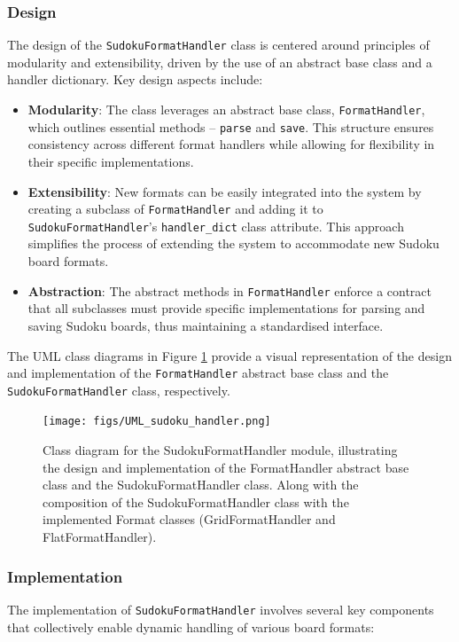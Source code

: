 \documentclass[11pt]{article}
\begin{document}
\subsubsection{Design}
The design of the \texttt{SudokuFormatHandler} class is centered around principles of modularity and extensibility, driven by the use of an abstract base class and a handler dictionary. Key design aspects include:

\begin{itemize}
    \item \textbf{Modularity}: The class leverages an abstract base class, \texttt{FormatHandler}, which outlines essential methods -- \texttt{parse} and \texttt{save}. This structure ensures consistency across different format handlers while allowing for flexibility in their specific implementations.
    \item \textbf{Extensibility}: New formats can be easily integrated into the system by creating a subclass of \texttt{FormatHandler} and adding it to \texttt{SudokuFormatHandler}'s \texttt{handler\_dict} class attribute. This approach simplifies the process of extending the system to accommodate new Sudoku board formats.
    \item \textbf{Abstraction}: The abstract methods in \texttt{FormatHandler} enforce a contract that all subclasses must provide specific implementations for parsing and saving Sudoku boards, thus maintaining a standardised interface.
\end{itemize}
The UML class diagrams in Figure \ref{fig:format_handler_uml} provide a visual representation of the design and implementation of the \texttt{FormatHandler} abstract base class and the \texttt{SudokuFormatHandler} class, respectively.
\begin{figure}[H]
    \centering
    \texttt{[image: figs/UML\_sudoku\_handler.png]}
    \caption{Class diagram for the SudokuFormatHandler module, illustrating the design and implementation of the FormatHandler abstract base class and the SudokuFormatHandler class. Along with the composition of the SudokuFormatHandler class with the implemented Format classes (GridFormatHandler and FlatFormatHandler).}
    \label{fig:format_handler_uml}
\end{figure}

\subsubsection{Implementation}
The implementation of \texttt{SudokuFormatHandler} involves several key components that collectively enable dynamic handling of various board formats:
\end{document}
